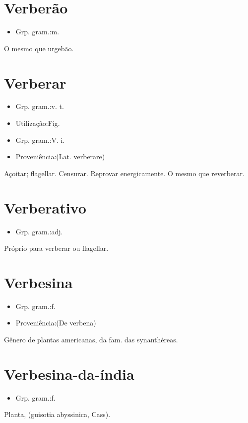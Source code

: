 \documentclass{article}
\begin{document}
\section{Verberão}
\begin{itemize}
\item {Grp. gram.:m.}
\end{itemize}
O mesmo que \textunderscore urgebão\textunderscore .
\section{Verberar}
\begin{itemize}
\item {Grp. gram.:v. t.}
\end{itemize}
\begin{itemize}
\item {Utilização:Fig.}
\end{itemize}
\begin{itemize}
\item {Grp. gram.:V. i.}
\end{itemize}
\begin{itemize}
\item {Proveniência:(Lat. \textunderscore verberare\textunderscore )}
\end{itemize}
Açoitar; flagellar.
Censurar.
Reprovar energicamente.
O mesmo que \textunderscore reverberar\textunderscore .
\section{Verberativo}
\begin{itemize}
\item {Grp. gram.:adj.}
\end{itemize}
Próprio para verberar ou flagellar.
\section{Verbesina}
\begin{itemize}
\item {Grp. gram.:f.}
\end{itemize}
\begin{itemize}
\item {Proveniência:(De \textunderscore verbena\textunderscore )}
\end{itemize}
Gênero de plantas americanas, da fam. das synanthéreas.
\section{Verbesina-da-índia}
\begin{itemize}
\item {Grp. gram.:f.}
\end{itemize}
Planta, (\textunderscore guisotia abyssinica\textunderscore , Cass).
\end{document}
